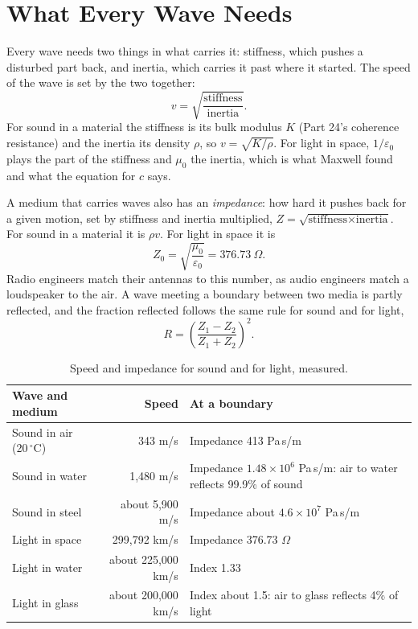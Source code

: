 \section{What Every Wave Needs}

Every wave needs two things in what carries it: stiffness, which pushes a disturbed part back, and inertia, which carries it past where it started. The speed of the wave is set by the two together:
\begin{equation}
v = \sqrt{\frac{\text{stiffness}}{\text{inertia}}}.
\end{equation}
For sound in a material the stiffness is its bulk modulus $K$ (Part 24's coherence resistance) and the inertia its density $\rho$, so $v = \sqrt{K/\rho}$. For light in space, $1/\varepsilon_0$ plays the part of the stiffness and $\mu_0$ the inertia, which is what Maxwell found and what the equation for $c$ says.

A medium that carries waves also has an \emph{impedance}: how hard it pushes back for a given motion, set by stiffness and inertia multiplied, $Z = \sqrt{\text{stiffness}\times\text{inertia}}$. For sound in a material it is $\rho v$. For light in space it is
\begin{equation}
Z_0 = \sqrt{\frac{\mu_0}{\varepsilon_0}} = 376.73~\Omega.
\end{equation}
Radio engineers match their antennas to this number, as audio engineers match a loudspeaker to the air. A wave meeting a boundary between two media is partly reflected, and the fraction reflected follows the same rule for sound and for light,
\begin{equation}
R = \left(\frac{Z_1 - Z_2}{Z_1 + Z_2}\right)^2 .
\end{equation}

\begin{table}[h]\centering\small
\caption{Speed and impedance for sound and for light, measured.}
\begin{tabularx}{\linewidth}{@{}l r X@{}}\toprule
\textbf{Wave and medium} & \textbf{Speed} & \textbf{At a boundary}\\\midrule
Sound in air (20\,$^\circ$C) & 343 m/s & Impedance 413 Pa\,s/m\\
Sound in water & 1,480 m/s & Impedance $1.48\times10^6$ Pa\,s/m: air to water reflects 99.9\% of sound\\
Sound in steel & about 5,900 m/s & Impedance about $4.6\times10^7$ Pa\,s/m\\
Light in space & 299,792 km/s & Impedance 376.73 $\Omega$\\
Light in water & about 225,000 km/s & Index 1.33\\
Light in glass & about 200,000 km/s & Index about 1.5: air to glass reflects 4\% of light\\\bottomrule
\end{tabularx}\label{tab:waves}\end{table}

